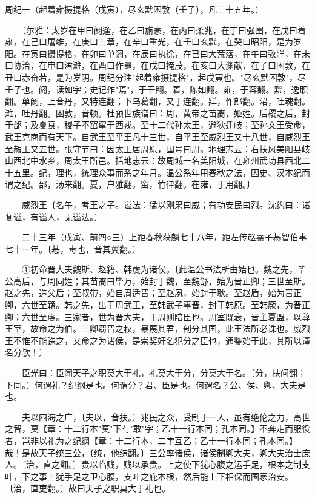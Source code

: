 周纪一（起着雍摄提格（戊寅），尽玄黓困敦（壬子），凡三十五年。）

　　〔尔雅：太岁在甲曰阏逢，在乙曰旃蒙，在丙曰柔兆，在丁曰强圉，在戊曰着雍，在己曰屠维，在庚曰上章，在辛曰重光，在壬曰玄黓，在癸曰昭阳，是为岁阳。在寅曰摄提格，在卯曰单阏，在辰曰执徐，在已曰大荒落，在午曰敦牂，在未曰协洽，在申曰涒滩，在酉曰作噩，在戌曰掩茂，在亥曰大渊献，在子曰困敦，在丑曰赤奋若，是为岁阴。周纪分注"起着雍摄提格"，起戊寅也。"尽玄黓困敦"，尽壬子也。阏，读如字；史记作"焉"，于干翻。着，陈如翻。雍，于容翻。黓，逸职翻。单阏，上音丹，又特连翻；下乌葛翻，又于连翻。牂，作郎翻。涒，吐魂翻。滩，吐丹翻。困敦，音顿。杜预世族谱曰：周，黄帝之苗裔，姬姓。后稷之后，封于邰；及夏衰，稷子不窋窜于西戎。至十二代孙太王，避狄迁岐；至孙文王受命，武王克商而有天下。自武王至平王凡十三世，自平王至威烈王又十八世，自威烈王至赧王又五世。张守节曰：因太王居周原，国号曰周。地理志云：右扶风美阳县岐山西北中水乡，周太王所邑。括地志云：故周城一名美阳城，在雍州武功县西北二十五里。纪，理也，统理众事而系之年月。温公系年用春秋之法，因史、汉本纪而谓之纪。邰，汤来翻。夏，户雅翻。窋，竹律翻。在雍，于用翻。〕

　　威烈王〔名午，考王之子。谥法：猛以刚果曰威；有功安民曰烈。沈约曰：诸复谥，有谥人，无谥法。〕

　　二十三年（戊寅、前四○三）上距春秋获麟七十八年，距左传赵襄子惎智伯事七十一年。〔惎，毒也，音其冀翻。〕

　　①初命晋大夫魏斯、赵籍、韩虔为诸侯。〔此温公书法所由始也。魏之先，毕公高后，与周同姓；其苗裔曰毕万，始封于魏，至魏舒，始为晋正卿；三世至斯。赵之先，造父后；至叔带，始自周适晋；至赵夙，始封于耿。至赵盾，始为晋正卿，六世至籍。韩之先，出于周武王，至韩武子事晋，封于韩原。至韩厥，为晋正卿；六世至虔。三家者，世为晋大夫，于周则陪臣也。周室既衰，晋主夏盟，以尊王室，故命之为伯。三卿窃晋之权，暴蔑其君，剖分其国，此王法所必诛也。威烈王不惟不能诛之，又命之为诸侯，是崇奖奸名犯分之臣也，通鉴始于此，其所以谨名分欤！〕

　　臣光曰：臣闻天子之职莫大于礼，礼莫大于分，分莫大于名。〔分，扶问翻；下同。〕何谓礼？纪纲是也。何谓分？君、臣是也。何谓名？公、侯、卿、大夫是也。

　　夫以四海之广，〔夫以，音扶。〕兆民之众，受制于一人，虽有绝伦之力，高世之智，莫【章：十二行本"莫"下有"敢"字；乙十一行本同；孔本同。】不奔走而服役者，岂非以礼为之纪纲【章：十二行本，二字互乙；乙十一行本同；孔本同。】哉！是故天子统三公，〔统，他综翻。〕三公率诸侯，诸侯制卿大夫，卿大夫治士庶人。〔治，直之翻。〕贵以临贱，贱以承贵。上之使下犹心腹之运手足，根本之制支叶，下之事上犹手足之卫心腹，支叶之庇本根，然后能上下相保而国家治安。〔治，直吏翻。〕故曰天子之职莫大于礼也。

